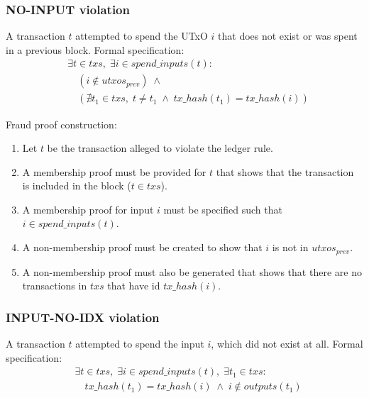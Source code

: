 \documentclass[../midgard.tex]{subfiles}
\begin{document}
\subsubsection{NO-INPUT violation}
\label{violation:NO-INPUT}
A transaction $t$ attempted to spend the UTxO $i$ that does not exist or was spent in a previous block.
Formal specification:
\begin{equation*}
\begin{split}
  &\exists t \in txs,\; \exists i \in spend\_inputs(t): \\
    &\quad(
      i \notin utxos_{prev}
    ) \;\land\\
    &\quad(
      \nexists t_1 \in txs,\;
      t \neq t_1 \;\land\; tx\_hash(t_1) = tx\_hash(i)
    )
\end{split}
\end{equation*}

Fraud proof construction:
\begin{enumerate}
  \item Let $t$ be the transaction alleged to violate the ledger rule. 
  \item A membership proof must be provided for $t$ that shows that the transaction is included in the block ($t \in txs$).
  \item A membership proof for input $i$ must be specified such that $i \in spend\_inputs(t)$.
  \item A non-membership proof must be created to show that $i$ is not in $utxos_{prev}$.
  \item A non-membership proof must also be generated that shows that there are no transactions in $txs$ that have id $tx\_hash(i)$.
\end{enumerate}

\subsubsection{INPUT-NO-IDX violation}
\label{violation:INPUT-NO-IDX}
A transaction $t$ attempted to spend the input $i$, which did not exist at all.
Formal specification:
\begin{equation*}
\begin{split}
  &\exists t \in txs,\; \exists i \in spend\_inputs(t),\; \exists t_1 \in txs: \\
    &\quad
      tx\_hash(t_1) = tx\_hash(i) \;\land\;
      i \notin outputs(t_1)
\end{split}
\end{equation*}
\end{document}
